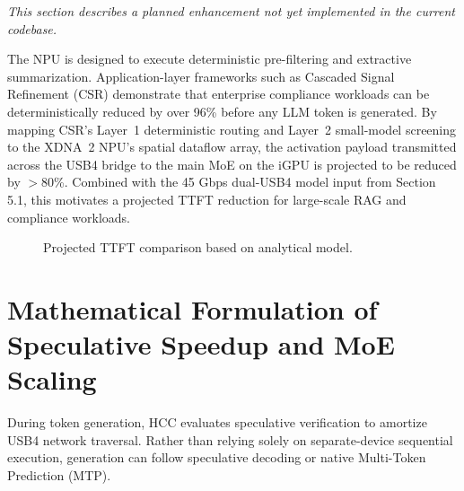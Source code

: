 \documentclass[11pt,a4paper]{article}
\begin{document}
\noindent\textit{This section describes a planned enhancement not yet implemented in the current codebase.}

The NPU is designed to execute deterministic pre-filtering and extractive summarization. Application-layer frameworks such as Cascaded Signal Refinement (CSR) \cite{csr} demonstrate that enterprise compliance workloads can be deterministically reduced by over 96\% before any LLM token is generated. By mapping CSR's Layer~1 deterministic routing and Layer~2 small-model screening to the XDNA~2 NPU's spatial dataflow array, the activation payload transmitted across the USB4 bridge to the main MoE on the iGPU is projected to be reduced by $>$80\%. Combined with the 45 Gbps dual-USB4 model input from Section 5.1, this motivates a projected TTFT reduction for large-scale RAG and compliance workloads.

\begin{figure}[ht!]
\centering
{}
\caption{Projected TTFT comparison based on analytical model.}
\label{fig:ttft}
\end{figure}

\section{Mathematical Formulation of Speculative Speedup and MoE Scaling}

During token generation, HCC evaluates speculative verification to amortize USB4 network traversal. Rather than relying solely on separate-device sequential execution, generation can follow speculative decoding \cite{spec_decode} or native Multi-Token Prediction (MTP).
\end{document}
